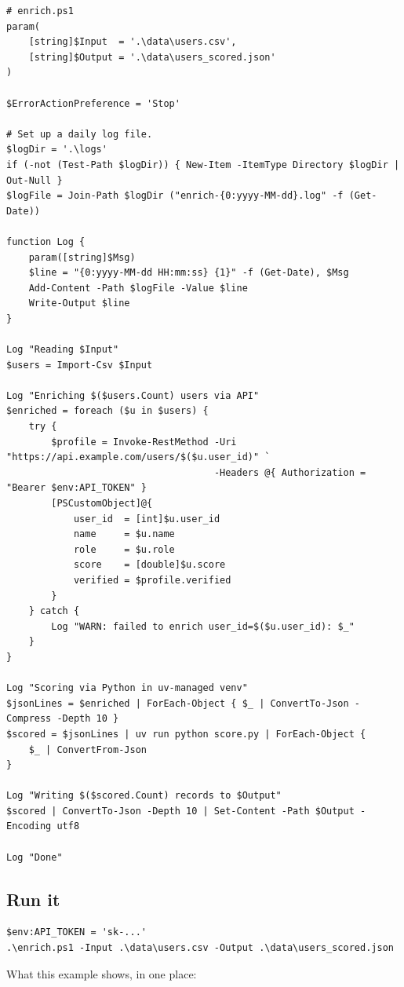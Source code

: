 \documentclass[11pt,a4paper]{article}
\begin{document}
\begin{lstlisting}[style=pwshstyle]
# enrich.ps1
param(
    [string]$Input  = '.\data\users.csv',
    [string]$Output = '.\data\users_scored.json'
)

$ErrorActionPreference = 'Stop'

# Set up a daily log file.
$logDir = '.\logs'
if (-not (Test-Path $logDir)) { New-Item -ItemType Directory $logDir | Out-Null }
$logFile = Join-Path $logDir ("enrich-{0:yyyy-MM-dd}.log" -f (Get-Date))

function Log {
    param([string]$Msg)
    $line = "{0:yyyy-MM-dd HH:mm:ss} {1}" -f (Get-Date), $Msg
    Add-Content -Path $logFile -Value $line
    Write-Output $line
}

Log "Reading $Input"
$users = Import-Csv $Input

Log "Enriching $($users.Count) users via API"
$enriched = foreach ($u in $users) {
    try {
        $profile = Invoke-RestMethod -Uri "https://api.example.com/users/$($u.user_id)" `
                                     -Headers @{ Authorization = "Bearer $env:API_TOKEN" }
        [PSCustomObject]@{
            user_id  = [int]$u.user_id
            name     = $u.name
            role     = $u.role
            score    = [double]$u.score
            verified = $profile.verified
        }
    } catch {
        Log "WARN: failed to enrich user_id=$($u.user_id): $_"
    }
}

Log "Scoring via Python in uv-managed venv"
$jsonLines = $enriched | ForEach-Object { $_ | ConvertTo-Json -Compress -Depth 10 }
$scored = $jsonLines | uv run python score.py | ForEach-Object {
    $_ | ConvertFrom-Json
}

Log "Writing $($scored.Count) records to $Output"
$scored | ConvertTo-Json -Depth 10 | Set-Content -Path $Output -Encoding utf8

Log "Done"
\end{lstlisting}

\subsection*{Run it}

\begin{lstlisting}[style=pwshstyle]
$env:API_TOKEN = 'sk-...'
.\enrich.ps1 -Input .\data\users.csv -Output .\data\users_scored.json
\end{lstlisting}

What this example shows, in one place:
\end{document}
